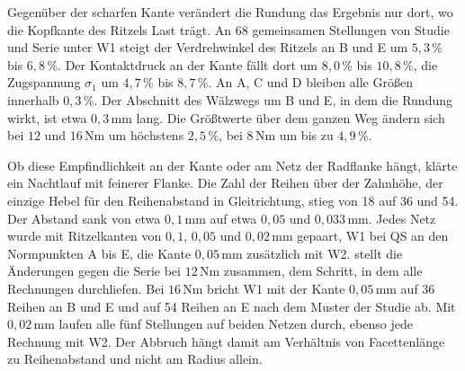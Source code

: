 Gegenüber der scharfen Kante verändert die Rundung das Ergebnis nur dort, wo die Kopfkante des Ritzels Last trägt. An 68 gemeinsamen Stellungen von Studie und Serie unter W1 steigt der Verdrehwinkel des Ritzels an B und E um $5{,}3$\,\% bis $6{,}8$\,\%. Der Kontaktdruck an der Kante fällt dort um $8{,}0$\,\% bis $10{,}8$\,\%, die Zugspannung $\sigma_{\mathrm{1}}$ um $4{,}7$\,\% bis $8{,}7$\,\%. An A, C und D bleiben alle Größen innerhalb $0{,}3$\,\%. Der Abschnitt des Wälzwegs um B und E, in dem die Rundung wirkt, ist etwa $0{,}3$\,mm lang. Die Größtwerte über dem ganzen Weg ändern sich bei $12$ und $16$\,Nm um höchstens $2{,}5$\,\%, bei $8$\,Nm um bis zu $4{,}9$\,\%.

Ob diese Empfindlichkeit an der Kante oder am Netz der Radflanke hängt, klärte ein Nachtlauf mit feinerer Flanke. Die Zahl der Reihen über der Zahnhöhe, der einzige Hebel für den Reihenabstand in Gleitrichtung, stieg von 18 auf 36 und 54. Der Abstand sank von etwa $0{,}1$\,mm auf etwa $0{,}05$ und $0{,}033$\,mm. Jedes Netz wurde mit Ritzelkanten von $0{,}1$, $0{,}05$ und $0{,}02$\,mm gepaart, W1 bei QS an den Normpunkten A bis E, die Kante $0{,}05$\,mm zusätzlich mit W2.  stellt die Änderungen gegen die Serie bei $12$\,Nm zusammen, dem Schritt, in dem alle Rechnungen durchliefen. Bei $16$\,Nm bricht W1 mit der Kante $0{,}05$\,mm auf 36 Reihen an B und E und auf 54 Reihen an E nach dem Muster der Studie ab. Mit $0{,}02$\,mm laufen alle fünf Stellungen auf beiden Netzen durch, ebenso jede Rechnung mit W2. Der Abbruch hängt damit am Verhältnis von Facettenlänge zu Reihenabstand und nicht am Radius allein.

